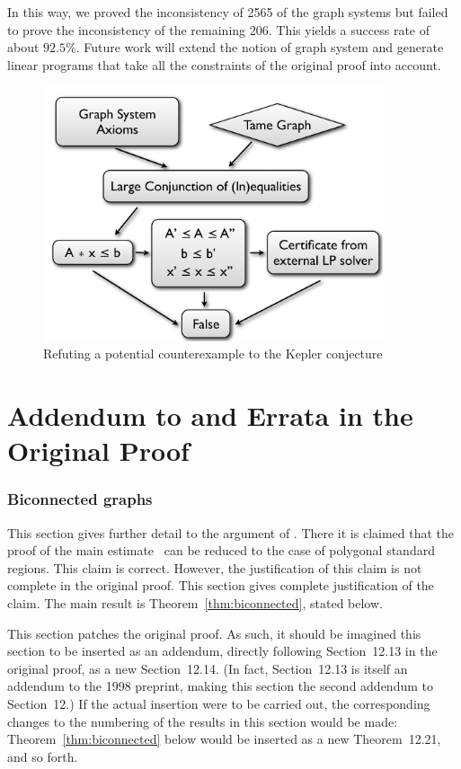 \documentclass[11pt]{amsart}
\begin{document}
In this way, we proved the inconsistency of 2565 of the graph systems but failed to prove the inconsistency of the remaining 206. 
This yields a success rate of about $92.5\%$. Future work will extend the notion of graph system and  generate linear programs
that take all the constraints of the original proof into account.


\begin{figure}
\begin{center}
\includegraphics[width=10cm]{lpapproach.pdf}
\end{center}
\caption{Refuting a potential counterexample to the Kepler conjecture}
\label{fig:lpapproach}
\end{figure}

\part{Addendum to and Errata in the Original Proof}

\section{Biconnected graphs}
\label{sec:biconnected}


This section gives further detail to the argument of \cite[\S12.7~p.131]{Hales:2006:DCG:4}.  There it is claimed that
the proof of the main estimate~\cite[Theorem~12.1]{Hales:2006:DCG:4} can be reduced to the case of polygonal standard regions.
This claim is correct. 
However, the justification of this claim is not complete in the original proof.
This section gives complete justification of the claim.   The main result is Theorem~\ref{thm:biconnected}, stated below.

This section patches the original proof.  As such, it should be imagined this section to be inserted as an addendum, directly following Section~12.13 in the original proof, as a new Section~12.14.  (In fact, Section~12.13 is itself an addendum to the 1998 preprint, making this section the second addendum to Section~12.)  If the actual insertion were to be carried out, the corresponding changes to the numbering of the results in this section would be made: Theorem~\ref{thm:biconnected} below would be inserted as a new Theorem~{12.21}, and so forth. 
\end{document}
